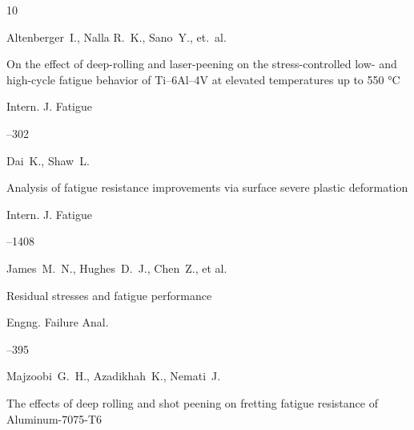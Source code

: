 \begin{thebibliography}{10}





\by Altenberger~I., Nalla R.~K., Sano~Y., et.~al.

\paper On the effect of deep-rolling and laser-peening on the stress-controlled low- and high-cycle fatigue behavior of Ti--6Al--4V at elevated temperatures up to 550 °C

\jour Intern. J. Fatigue



--302






\by Dai~K., Shaw~L.

\paper Analysis of fatigue resistance improvements via surface severe plastic deformation

\jour Intern. J. Fatigue




--1408






\by James~M.~N., Hughes~D.~J., Chen~Z., et al.

\paper Residual stresses and fatigue performance

\jour Engng. Failure Anal.




--395






\by Majzoobi~G.~H., Azadikhah~K., Nemati~J.

\paper The effects of deep rolling and shot peening on fretting fatigue resistance of Aluminum-7075-T6


\end{thebibliography}
